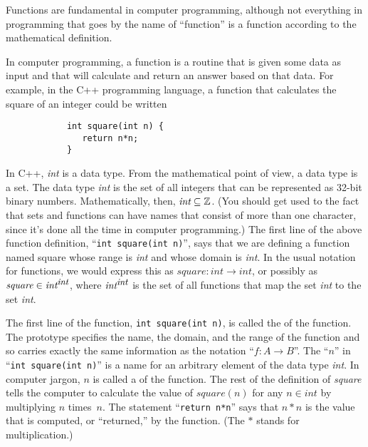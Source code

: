 Functions are fundamental in computer programming,
although not everything in programming that goes by the name of ``function''
is a function according to the mathematical definition.

In computer programming, a function is a routine that is given 
some data as input and that will calculate and return an
answer based on that data.  For example, in the C++ programming
language, a function that calculates the square of an integer
could be written
\begin{verbatim}
            int square(int n) {
               return n*n;
            }
\end{verbatim}
In C++, \textit{int} is a data type.  From the mathematical
point of view, a data type is a set.  The data type \textit{int}
is the set of all integers that can be represented as 32-bit 
binary numbers.  Mathematically, then, $\textit{int}\subseteq{\mathbb Z}$.
(You should get used to the fact that sets and functions can
have names that consist of more than one character, since
it's done all the time in computer programming.)
The first line of the above function definition,
``\verb=int square(int n)='', says that we are defining
a function named square whose range is \textit{int}
and whose domain is \textit{int}.  In the usual notation for
functions, we would express this as $\textit{square}\colon \textit{int}\to\textit{int}$,
or possibly as $\textit{square}\in{\textit{int}}^{\textit{\small{int}}}$,
where ${\textit{int}}^{\textit{\small{int}}}$ is the set of all
functions that map the set \textit{int} to the set \textit{int}.

The first line of the function, \verb=int square(int n)=, is called
the  of the function.  The prototype specifies the
name, the domain, and the range of the function and so carries
exactly the same information as the notation ``$f\colon A\to B$''.
The ``$n$'' in ``\verb=int square(int n)='' is a name for
an arbitrary element of the data type \textit{int}.  In computer
jargon, $n$ is called a  of the function.
The rest of the definition of \textit{square} tells the computer
to calculate the value of $\textit{square}(n)$ for any $n\in\textit{int}$
by multiplying $n$ times~$n$.  The statement ``\verb=return n*n=''
says that $n*n$ is the value that is computed, or ``returned,''
by the function.  (The $*$ stands for multiplication.)

